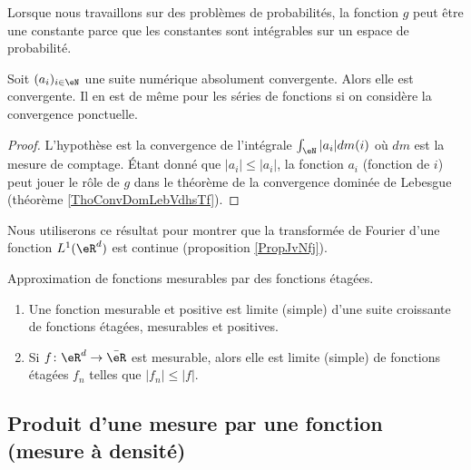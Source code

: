 \begin{remark}
    Lorsque nous travaillons sur des problèmes de probabilités, la fonction \( g\) peut être une constante parce que les constantes sont intégrables sur un espace de probabilité.
\end{remark}

\begin{corollary}       \label{CorCvAbsNormwEZdRc}
    Soit \( (a_i)_{i\in \eN}\) une suite numérique absolument convergente. Alors elle est convergente. Il en est de même pour les séries de fonctions si on considère la convergence ponctuelle.
\end{corollary}

\begin{proof}
    L'hypothèse est la convergence de l'intégrale \( \int_{\eN}| a_i |dm(i)\) où \( dm\) est la mesure de comptage. Étant donné que \( | a_i |\leq | a_i |\), la fonction \( a_i\) (fonction de \( i\)) peut jouer le rôle de \( g\) dans le théorème de la convergence dominée de Lebesgue (théorème \ref{ThoConvDomLebVdhsTf}).
\end{proof}
Nous utiliserons ce résultat pour montrer que la transformée de Fourier d'une fonction \( L^1(\eR^d)\) est continue (proposition \ref{PropJvNfj}).

\begin{proposition} \label{PropUXjnwLf}
    Approximation de fonctions mesurables par des fonctions étagées.
    \begin{enumerate}
        \item
            Une fonction mesurable et positive est limite (simple) d'une suite croissante de fonctions étagées, mesurables et positives.
        \item
            Si \( f\colon \eR^d\to \bar \eR\) est mesurable, alors elle est limite (simple) de fonctions étagées \( f_n\) telles que \( | f_n |\leq | f |\).
    \end{enumerate}
\end{proposition}

\subsection{Produit d'une mesure par une fonction (mesure à densité)}

